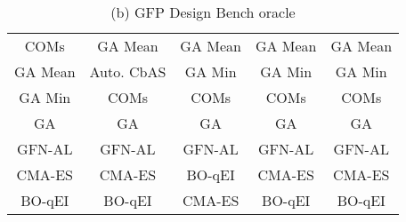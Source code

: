 \begin{table*}[t!]
\begin{minipage}{.48\textwidth}
\begin{adjustbox}{width=\linewidth,center}
\begin{tabular}{|c|c|c|c|c|}
\cellcolor[HTML]{C9DAF8}COMs  & \cellcolor[HTML]{F4CCCC}GA Mean  & \cellcolor[HTML]{F4CCCC}GA Mean  & \cellcolor[HTML]{F4CCCC}GA Mean  & \cellcolor[HTML]{F4CCCC}GA Mean  \\ 
\cellcolor[HTML]{F4CCCC}GA Mean  & \cellcolor[HTML]{D9EAD3}Auto. CbAS & \cellcolor[HTML]{CFE2F3}GA Min & \cellcolor[HTML]{CFE2F3}GA Min & \cellcolor[HTML]{CFE2F3}GA Min \\ 
\cellcolor[HTML]{CFE2F3}GA Min & \cellcolor[HTML]{C9DAF8}COMs  & \cellcolor[HTML]{C9DAF8}COMs  & \cellcolor[HTML]{C9DAF8}COMs  & \cellcolor[HTML]{C9DAF8}COMs  \\ 
\cellcolor[HTML]{D9D2E9}GA & \cellcolor[HTML]{D9D2E9}GA & \cellcolor[HTML]{D9D2E9}GA & \cellcolor[HTML]{D9D2E9}GA & \cellcolor[HTML]{D9D2E9}GA \\ 
\cellcolor[HTML]{F8E3A6}GFN-AL  & \cellcolor[HTML]{F8E3A6}GFN-AL  & \cellcolor[HTML]{F8E3A6}GFN-AL  & \cellcolor[HTML]{F8E3A6}GFN-AL  & \cellcolor[HTML]{F8E3A6}GFN-AL  \\ 
\cellcolor[HTML]{EAD1DC}CMA-ES & \cellcolor[HTML]{EAD1DC}CMA-ES & \cellcolor[HTML]{B5DDCA}BO-qEI & \cellcolor[HTML]{EAD1DC}CMA-ES & \cellcolor[HTML]{EAD1DC}CMA-ES \\ 
\cellcolor[HTML]{B5DDCA}BO-qEI & \cellcolor[HTML]{B5DDCA}BO-qEI & \cellcolor[HTML]{EAD1DC}CMA-ES & \cellcolor[HTML]{B5DDCA}BO-qEI & \cellcolor[HTML]{B5DDCA}BO-qEI \\ 
 \bottomrule  
            \end{tabular}
            \end{adjustbox}
      \caption*{(b) GFP Design Bench oracle}
      \label{tab:gfp_rankings}
    \end{minipage}
\end{table*}
